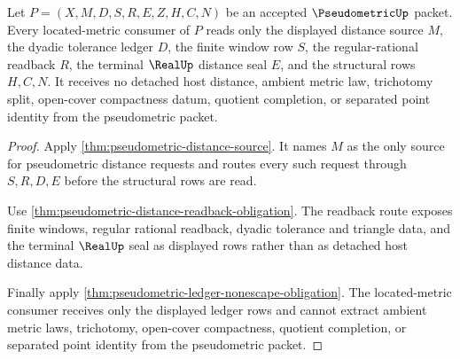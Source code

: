\begin{theorem}
\label{thm:pseudometric-located-metric-readiness}
Let $P=(X,M,D,S,R,E,Z,H,C,N)$ be an accepted $\PseudometricUp$ packet. Every located-metric consumer of $P$ reads only the displayed distance source $M$, the dyadic tolerance ledger $D$, the finite window row $S$, the regular-rational readback $R$, the terminal $\RealUp$ distance seal $E$, and the structural rows $H,C,N$. It receives no detached host distance, ambient metric law, trichotomy split, open-cover compactness datum, quotient completion, or separated point identity from the pseudometric packet.
\end{theorem}
\begin{proof}
Apply \autoref{thm:pseudometric-distance-source}. It names $M$ as the only source for pseudometric distance requests and routes every such request through $S,R,D,E$ before the structural rows are read.

Use \autoref{thm:pseudometric-distance-readback-obligation}. The readback route exposes finite windows, regular rational readback, dyadic tolerance and triangle data, and the terminal $\RealUp$ seal as displayed rows rather than as detached host distance data.

Finally apply \autoref{thm:pseudometric-ledger-nonescape-obligation}. The located-metric consumer receives only the displayed ledger rows and cannot extract ambient metric laws, trichotomy, open-cover compactness, quotient completion, or separated point identity from the pseudometric packet.
\end{proof}

